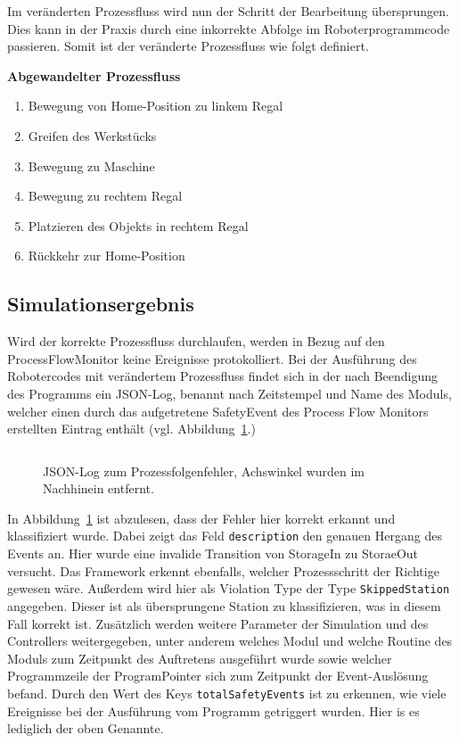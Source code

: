 Im veränderten Prozessfluss wird nun der Schritt der Bearbeitung übersprungen.
Dies kann in der Praxis durch eine inkorrekte Abfolge im Roboterprogrammcode
passieren. Somit ist der veränderte Prozessfluss wie folgt definiert.

 
\textbf{Abgewandelter Prozessfluss}
\begin{enumerate}
  \item Bewegung von Home-Position zu linkem Regal
  \item Greifen des Werkstücks
  \item Bewegung zu Maschine
  \item Bewegung zu rechtem Regal
  \item Platzieren des Objekts in rechtem Regal
  \item Rückkehr zur Home-Position
\end{enumerate}

\subsection{Simulationsergebnis}
Wird der korrekte Prozessfluss durchlaufen, werden in Bezug auf den
ProcessFlowMonitor keine Ereignisse protokolliert.
Bei der Ausführung des Robotercodes mit verändertem Prozessfluss findet sich in
der nach Beendigung des Programms ein JSON-Log, benannt nach
Zeitstempel und Name des Moduls,
welcher einen durch das aufgetretene SafetyEvent des Process Flow Monitors
erstellten Eintrag enthält (vgl. Abbildung~\ref{listing:processflowerror}.)

\begin{figure}[H]
  \inputminted[fontsize=\footnotesize]{json}{code-snippets/processflowerror.json}
  \caption{JSON-Log zum Prozessfolgenfehler, Achswinkel wurden im Nachhinein
  entfernt.}
  \label{listing:processflowerror}
\end{figure}

In Abbildung~\ref{listing:processflowerror} ist abzulesen, dass der
Fehler hier korrekt erkannt und klassifiziert wurde. Dabei zeigt das Feld
\texttt{description} den genauen Hergang des Events an. Hier wurde eine invalide
Transition von StorageIn zu StoraeOut versucht. Das Framework erkennt
ebenfalls, welcher Prozessschritt der Richtige gewesen wäre. Außerdem wird hier
als Violation Type der Type \texttt{SkippedStation} angegeben. Dieser ist als
übersprungene Station zu klassifizieren, was in diesem Fall korrekt ist.
Zusätzlich werden weitere Parameter der Simulation und des Controllers
weitergegeben, unter anderem welches Modul und welche Routine des Moduls zum
Zeitpunkt des Auftretens ausgeführt wurde sowie welcher Programmzeile der
ProgramPointer sich zum Zeitpunkt der Event-Auslösung befand. Durch den Wert des
Keys \texttt{totalSafetyEvents} ist zu erkennen, wie viele Ereignisse bei der
Ausführung vom Programm getriggert wurden. Hier is es lediglich der oben
Genannte.

